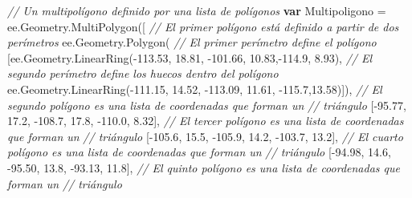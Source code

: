 \documentclass[
  12pt,
  letterpaper,
  twoside]{book}
\newenvironment{Shaded}{\begin{snugshade}}{\end{snugshade}}
\newcommand{\AttributeTok}[1]{\textcolor[rgb]{0.48,0.12,0.64}{#1}}
\newcommand{\CommentTok}[1]{\textcolor[rgb]{0.24,0.58,0.00}{\textit{#1}}}
\newcommand{\FloatTok}[1]{\textcolor[rgb]{0.28,0.53,0.93}{#1}}
\newcommand{\FunctionTok}[1]{\textcolor[rgb]{0.48,0.12,0.64}{#1}}
\newcommand{\KeywordTok}[1]{\textcolor[rgb]{0.00,0.00,0.00}{\textbf{#1}}}
\newcommand{\NormalTok}[1]{#1}
\newcommand{\OperatorTok}[1]{\textcolor[rgb]{0.00,0.00,0.00}{#1}}
\begin{document}
\begin{Shaded}
\begin{Highlighting}[]
\CommentTok{// Un multipolígono definido por una lista de polígonos}
\KeywordTok{var}\NormalTok{ Multipoligono }\OperatorTok{=}\NormalTok{ ee}\OperatorTok{.}\AttributeTok{Geometry}\OperatorTok{.}\FunctionTok{MultiPolygon}\NormalTok{([}
    \CommentTok{// El primer polígono está definido a partir de dos perímetros}
\NormalTok{    ee}\OperatorTok{.}\AttributeTok{Geometry}\OperatorTok{.}\FunctionTok{Polygon}\NormalTok{(  }
\CommentTok{// El primer perímetro define el polígono                }
\NormalTok{      [ee}\OperatorTok{.}\AttributeTok{Geometry}\OperatorTok{.}\FunctionTok{LinearRing}\NormalTok{(}\OperatorTok{{-}}\FloatTok{113.53}\OperatorTok{,} \FloatTok{18.81}\OperatorTok{,} \OperatorTok{{-}}\FloatTok{101.66}\OperatorTok{,} \FloatTok{10.83}\OperatorTok{,{-}}\FloatTok{114.9}\OperatorTok{,} \FloatTok{8.93}\NormalTok{)}\OperatorTok{,}    
      \CommentTok{// El segundo perímetro define los huecos dentro del polígono}
\NormalTok{ee}\OperatorTok{.}\AttributeTok{Geometry}\OperatorTok{.}\FunctionTok{LinearRing}\NormalTok{(}\OperatorTok{{-}}\FloatTok{111.15}\OperatorTok{,} \FloatTok{14.52}\OperatorTok{,} \OperatorTok{{-}}\FloatTok{113.09}\OperatorTok{,} \FloatTok{11.61}\OperatorTok{,} \OperatorTok{{-}}\FloatTok{115.7}\OperatorTok{,}\FloatTok{13.58}\NormalTok{)])}\OperatorTok{,}
    \CommentTok{// El segundo polígono es una lista de coordenadas que forman un }
    \CommentTok{// triángulo}
\NormalTok{    [}\OperatorTok{{-}}\FloatTok{95.77}\OperatorTok{,} \FloatTok{17.2}\OperatorTok{,}
     \OperatorTok{{-}}\FloatTok{108.7}\OperatorTok{,} \FloatTok{17.8}\OperatorTok{,}
     \OperatorTok{{-}}\FloatTok{110.0}\OperatorTok{,} \FloatTok{8.32}\NormalTok{]}\OperatorTok{,}
    \CommentTok{// El tercer polígono es una lista de coordenadas que forman un }
    \CommentTok{// triángulo}
\NormalTok{    [}\OperatorTok{{-}}\FloatTok{105.6}\OperatorTok{,} \FloatTok{15.5}\OperatorTok{,}                
     \OperatorTok{{-}}\FloatTok{105.9}\OperatorTok{,} \FloatTok{14.2}\OperatorTok{,}
     \OperatorTok{{-}}\FloatTok{103.7}\OperatorTok{,} \FloatTok{13.2}\NormalTok{]}\OperatorTok{,}
    \CommentTok{// El cuarto polígono es una lista de coordenadas que forman un }
    \CommentTok{// triángulo}
\NormalTok{    [}\OperatorTok{{-}}\FloatTok{94.98}\OperatorTok{,} \FloatTok{14.6}\OperatorTok{,}         
     \OperatorTok{{-}}\FloatTok{95.50}\OperatorTok{,} \FloatTok{13.8}\OperatorTok{,}
     \OperatorTok{{-}}\FloatTok{93.13}\OperatorTok{,} \FloatTok{11.8}\NormalTok{]}\OperatorTok{,}
    \CommentTok{// El quinto polígono es una lista de coordenadas que forman un }
    \CommentTok{// triángulo}

\end{Highlighting}
\end{Shaded}
\end{document}
